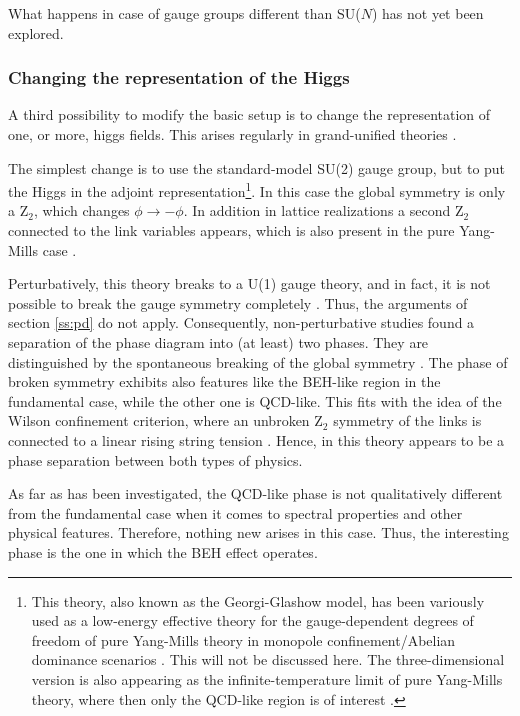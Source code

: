 \documentclass[final,twoside,12pt]{article}
\newcommand*{\1}{1\!\!\!\bot}
\begin{document}
What happens in case of gauge groups different than SU($N$) has not yet been explored.

\subsubsection{Changing the representation of the Higgs}\label{sss:rep}

A third possibility to modify the basic setup is to change the representation of one, or more, higgs fields. This arises regularly in grand-unified theories \cite{Bohm:2001yx,Langacker:1980js}.

The simplest change is to use the standard-model SU(2) gauge group, but to put the Higgs in the adjoint representation\footnote{This theory, also known as the Georgi-Glashow model, has been variously used as a low-energy effective theory for the gauge-dependent degrees of freedom of pure Yang-Mills theory in monopole confinement/Abelian dominance scenarios \cite{Greensite:2011zz,Ripka:2003vv,Kondo:2016ywd,Nishino:2018mwi}. This will not be discussed here. The three-dimensional version is also appearing as the infinite-temperature limit of pure Yang-Mills theory, where then only the QCD-like region is of interest \cite{Kajantie:1995dw,Maas:2011se,Hart:1999dj,Cucchieri:2001tw,Maas:2004se}.}. In this case the global symmetry is only a Z$_2$, which changes $\phi\to-\phi$. In addition in lattice realizations a second Z$_2$ connected to the link variables appears, which is also present in the pure Yang-Mills case \cite{Gattringer:2010zz}.

Perturbatively, this theory breaks to a U(1) gauge theory, and in fact, it is not possible to break the gauge symmetry completely \cite{O'Raifeartaigh:1986vq}. Thus, the arguments of section \ref{ss:pd} do not apply. Consequently, non-perturbative studies found a separation of the phase diagram into (at least) two phases. They are distinguished by the spontaneous breaking of the global symmetry \cite{Lang:1981qg,Drouffe:1984hb,Baier:1986ni,Capri:2012cr,Kondo:2016ywd}. The phase of broken symmetry exhibits also features like the BEH-like region in the fundamental case, while the other one is QCD-like. This fits with the idea of the Wilson confinement criterion, where an unbroken Z$_2$ symmetry of the links is connected to a linear rising string tension \cite{Greensite:2011zz,Gattringer:2010zz}. Hence, in this theory appears to be a phase separation between both types of physics.

As far as has been investigated, the QCD-like phase is not qualitatively different from the fundamental case when it comes to spectral properties and other physical features. Therefore, nothing new arises in this case. Thus, the interesting phase is the one in which the BEH effect operates. 
\end{document}
